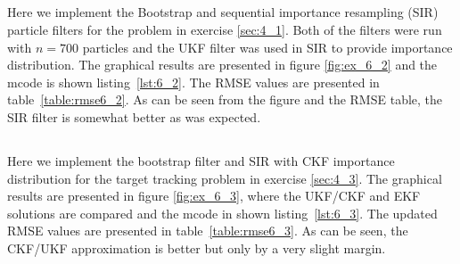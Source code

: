 \documentclass[a4paper,oneside,article]{memoir}
\begin{document}
\subsection{}\label{sec:6_2}

Here we implement the Bootstrap and sequential importance resampling (SIR) particle filters 
for the problem in exercise \ref{sec:4_1}. Both of the filters were run with $n=700$ particles and
the UKF filter was used in SIR to provide importance distribution.
The graphical results are presented in figure \ref{fig:ex_6_2} and the
mcode is shown listing~\ref{lst:6_2}. The RMSE values are presented in table~\ref{table:rmse6_2}. As can be seen
from the figure and the RMSE table, the SIR filter is somewhat better as was expected.

\begin{table}[h]
	\centering
	
	\label{table:rmse6_2}
\end{table}


\clearpage



\subsection{}\label{sec:6_3}

Here we implement the bootstrap filter and SIR with CKF importance distribution for the target tracking problem in
exercise \ref{sec:4_3}. The graphical results are presented in figure \ref{fig:ex_6_3}, where the UKF/CKF and EKF solutions
are compared and the mcode in shown listing~\ref{lst:6_3}. The updated RMSE values are presented
in table~\ref{table:rmse6_3}. As can be seen, the CKF/UKF approximation is better but only by a very
slight margin. 
\end{document}
